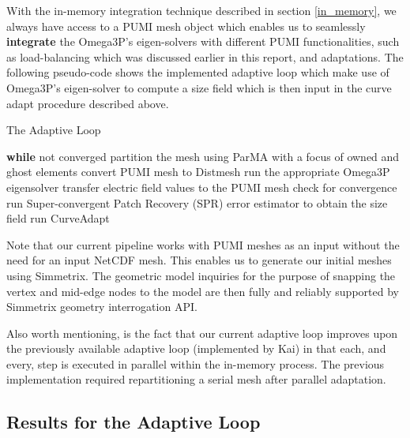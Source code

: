 \documentclass[review,12pt]{elsarticle_summary_report}
\begin{document}
With the in-memory integration technique described in section \ref{in_memory}, we always have access to a PUMI mesh object which enables us to seamlessly \textbf{integrate} the Omega3P's eigen-solvers with different PUMI functionalities, such as load-balancing which was discussed earlier in this report, and adaptations. The following pseudo-code shows the implemented adaptive loop which make use of Omega3P's eigen-solver to compute a size field which is then input in the curve adapt procedure described above.

\begin{algorithm}
\caption{The Adaptive Loop}\label{adapt_loop}
\begin{algorithmic}[1]
\State \textbf{while} not converged
\State \quad partition the mesh using ParMA with a focus of owned and ghost elements
\State \quad convert PUMI mesh to Distmesh
\State \quad run the appropriate Omega3P eigensolver
\State \quad transfer electric field values to the PUMI mesh
\State \quad check for convergence
\State \quad run Super-convergent Patch Recovery (SPR) error estimator to obtain the size field
\State \quad run CurveAdapt
\end{algorithmic}
\end{algorithm}

Note that our current pipeline works with PUMI meshes as an input without the need for an input NetCDF mesh. This enables us to generate our initial meshes using Simmetrix. The geometric model inquiries for the purpose of snapping the vertex and mid-edge nodes to the model are then fully and reliably supported by Simmetrix geometry interrogation API.

Also worth mentioning, is the fact that our current adaptive loop improves upon the previously available adaptive loop (implemented by Kai) in that each, and every, step is executed in parallel within the in-memory process. The previous implementation required repartitioning a serial mesh after parallel adaptation.

\subsection{Results for the Adaptive Loop}
\end{document}

